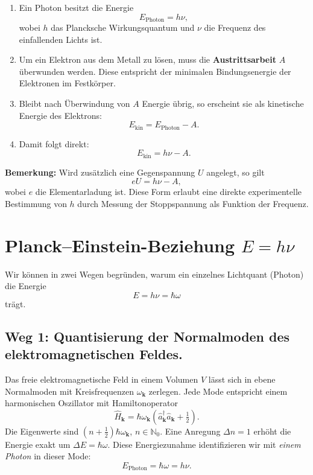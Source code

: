 \begin{enumerate}
	\item Ein Photon besitzt die Energie
	\[
	E_{\text{Photon}} = h \nu,
	\]
	wobei \( h \) das Plancksche Wirkungsquantum und \( \nu \) die Frequenz des einfallenden Lichts ist.
	
	\item Um ein Elektron aus dem Metall zu lösen, muss die \textbf{Austrittsarbeit} \( A \) überwunden werden. Diese entspricht der minimalen Bindungsenergie der Elektronen im Festkörper.
	
	\item Bleibt nach Überwindung von \( A \) Energie übrig, so erscheint sie als kinetische Energie des Elektrons:
	\[
	E_{\text{kin}} = E_{\text{Photon}} - A.
	\]
	
	\item Damit folgt direkt:
	\[
	E_{\text{kin}} = h \nu - A.
	\]
\end{enumerate}

\textbf{Bemerkung:}  
Wird zusätzlich eine Gegenspannung \( U \) angelegt, so gilt
\[
eU = h \nu - A,
\]
wobei \( e \) die Elementarladung ist. Diese Form erlaubt eine direkte experimentelle Bestimmung von \( h \) durch Messung der Stoppspannung als Funktion der Frequenz.

\section{Planck–Einstein-Beziehung \texorpdfstring{$E = h\nu$}{E = hν}}
\label{anhangA:planckEinstein}

Wir können in zwei Wegen begründen, warum ein einzelnes Lichtquant (Photon) die Energie
\[
E = h\nu = \hbar \omega
\]
trägt.

\subsection*{Weg 1: Quantisierung der Normalmoden des elektromagnetischen Feldes.}
Das freie elektromagnetische Feld in einem Volumen \(V\) lässt sich in ebene Normalmoden mit Kreisfrequenzen \(\omega_{\mathbf{k}}\) zerlegen. Jede Mode entspricht einem harmonischen Oszillator mit Hamiltonoperator
\[
\hat H_{\mathbf{k}}=\hbar \omega_{\mathbf{k}}\!\left(\hat a_{\mathbf{k}}^\dagger \hat a_{\mathbf{k}}+\tfrac12\right).
\]
Die Eigenwerte sind \((n+\tfrac12)\hbar\omega_{\mathbf{k}}\), \(n\in \mathbb{N}_0\). 
Eine Anregung \(\Delta n = 1\) erhöht die Energie exakt um \(\Delta E = \hbar \omega\). 
Diese Energiezunahme identifizieren wir mit \emph{einem Photon} in dieser Mode:
\[
E_{\text{Photon}}=\hbar\omega=h\nu.
\]

